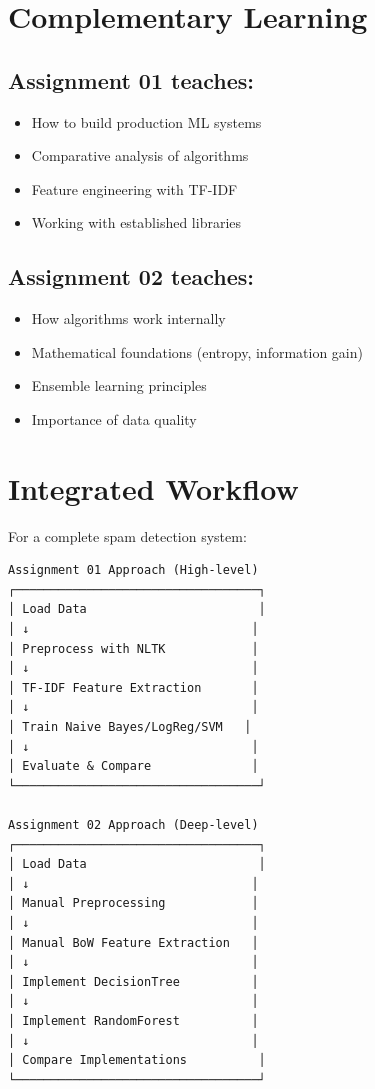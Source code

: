 \documentclass[14pt,a4paper]{report}
\begin{document}
\section{Complementary Learning}

\subsection{Assignment 01 teaches:}

\begin{itemize}
    \item How to build production ML systems
    \item Comparative analysis of algorithms
    \item Feature engineering with TF-IDF
    \item Working with established libraries
\end{itemize}

\subsection{Assignment 02 teaches:}

\begin{itemize}
    \item How algorithms work internally
    \item Mathematical foundations (entropy, information gain)
    \item Ensemble learning principles
    \item Importance of data quality
\end{itemize}

\section{Integrated Workflow}

For a complete spam detection system:

\begin{verbatim}
Assignment 01 Approach (High-level)
┌──────────────────────────────────┐
│ Load Data                        │
│ ↓                               │
│ Preprocess with NLTK            │
│ ↓                               │
│ TF-IDF Feature Extraction       │
│ ↓                               │
│ Train Naive Bayes/LogReg/SVM   │
│ ↓                               │
│ Evaluate & Compare              │
└──────────────────────────────────┘

Assignment 02 Approach (Deep-level)
┌──────────────────────────────────┐
│ Load Data                        │
│ ↓                               │
│ Manual Preprocessing            │
│ ↓                               │
│ Manual BoW Feature Extraction   │
│ ↓                               │
│ Implement DecisionTree          │
│ ↓                               │
│ Implement RandomForest          │
│ ↓                               │
│ Compare Implementations          │
└──────────────────────────────────┘
\end{verbatim}
\end{document}
